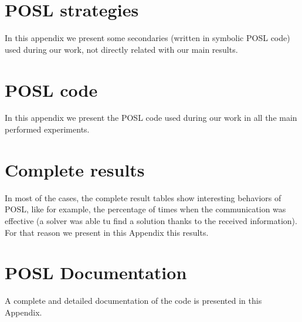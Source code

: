 \documentclass[a4paper]{book} %
\newcommand{\posl}{{\sc POSL}}
\begin{document}
\begin{appendices}
\noappendicestocpagenum
\addappheadtotoc

\chapter{\posl{} strategies}

In this appendix we present some secondaries \cstrs{} (written in symbolic \posl{} code) used during our work, not directly related with our main results.

\chapter{\posl{} code}

In this appendix we present the \posl{} code used during our work in all the main performed experiments.

\chapter{Complete results}

In most of the cases, the complete result tables show interesting behaviors of \posl{}, like for example, the percentage of times when the communication was effective (a solver was able tu find a solution thanks to the received information). For that reason we present in this Appendix this results.

\chapter{\posl{} Documentation}

A complete and detailed documentation of the code is presented in this Appendix.

\end{appendices}




%
%
%
%
%
%
%
%
%
%
%
%
\end{document}
